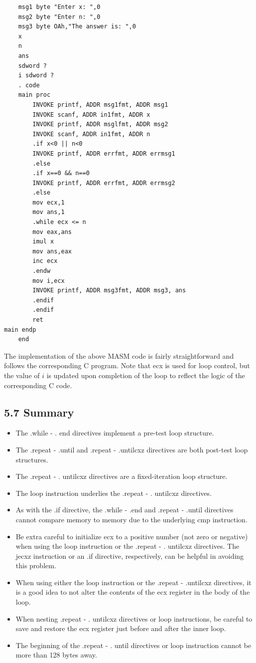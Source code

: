 \documentclass[10pt]{book}
\begin{document}
\begin{verbatim}
    msg1 byte "Enter x: ",0
    msg2 byte "Enter n: ",0
    msg3 byte OAh,"The answer is: ",0
    x
    n
    ans
    sdword ?
    i sdword ?
    . code
    main proc
        INVOKE printf, ADDR msg1fmt, ADDR msg1
        INVOKE scanf, ADDR in1fmt, ADDR x
        INVOKE printf, ADDR msglfmt, ADDR msg2
        INVOKE scanf, ADDR in1fmt, ADDR n
        .if x<0 || n<0
        INVOKE printf, ADDR errfmt, ADDR errmsg1
        .else
        .if x==0 && n==0
        INVOKE printf, ADDR errfmt, ADDR errmsg2
        .else
        mov ecx,1
        mov ans,1
        .while ecx <= n
        mov eax,ans
        imul x
        mov ans,eax
        inc ecx
        .endw
        mov i,ecx
        INVOKE printf, ADDR msg3fmt, ADDR msg3, ans
        .endif
        .endif
        ret
main endp
    end
\end{verbatim}

The implementation of the above MASM code is fairly straightforward and follows the corresponding C program. Note that ecx is used for loop control, but the value of $i$ is updated upon completion of the loop to reflect the logic of the corresponding C code.

\subsection*{5.7 Summary}
\begin{itemize}
  \item The .while - . end directives implement a pre-test loop structure.
  \item The .repeat - .until and .repeat - .untilcxz directives are both post-test loop structures.
  \item The .repeat - . untilcxz directives are a fixed-iteration loop structure.
  \item The loop instruction underlies the .repeat - . untilcxz directives.
  \item As with the .if directive, the .while - .end and .repeat - .until directives cannot compare memory to memory due to the underlying cmp instruction.
  \item Be extra careful to initialize ecx to a positive number (not zero or negative) when using the loop instruction or the .repeat - . untilcxz directives. The jecxz instruction or an .if directive, respectively, can be helpful in avoiding this problem.
  \item When using either the loop instruction or the .repeat - .untilcxz directives, it is a good idea to not alter the contents of the ecx register in the body of the loop.
  \item When nesting .repeat - . untilcxz directives or loop instructions, be careful to save and restore the ecx register just before and after the inner loop.
  \item The beginning of the .repeat - . until directives or loop instruction cannot be more than 128 bytes away.
\end{itemize}
\end{document}
